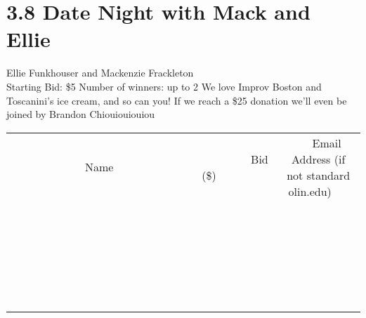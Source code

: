 \documentclass[11pt]{article}
\begin{document}
\section*{3.8 Date Night with Mack and Ellie}
Ellie Funkhouser and Mackenzie Frackleton
\\
Starting Bid: \$5
\newline
Number of winners: up to 2
\newline
We love Improv Boston and Toscanini's ice cream, and so can you! If we reach a \$25 donation we'll even be joined by Brandon Chiouiouiouiou
\\[6ex]
\begin{tabular}{c c c}
~~~~~~~~~~~~~Name~~~~~~~~~~~~~ & ~~~~~~~~~Bid (\$)~~~~~~~~~  & ~~~Email Address (if not standard olin.edu)~~~\\
 & & \\
\hline
 & & \\
\hline
 & & \\
\hline
 & & \\
\hline
 & & \\
\hline
 & & \\
\hline
 & & \\
\hline
 & & \\
\hline
 & & \\
\hline
 & & \\
\hline
 & & \\
\hline
 & & \\
\hline
 & & \\
\hline
 & & \\
\hline
 & & \\
\hline
 & & \\
\hline
 & & \\
\hline
 & & \\
\hline
 & & \\
\hline
 & & \\
\hline
 & & \\
\hline
 & & \\
\hline
 & & \\
\hline
 & & \\
\hline
 & & \\
\hline
 & & \\
\hline
\end{tabular}
\newpage
\end{document}
